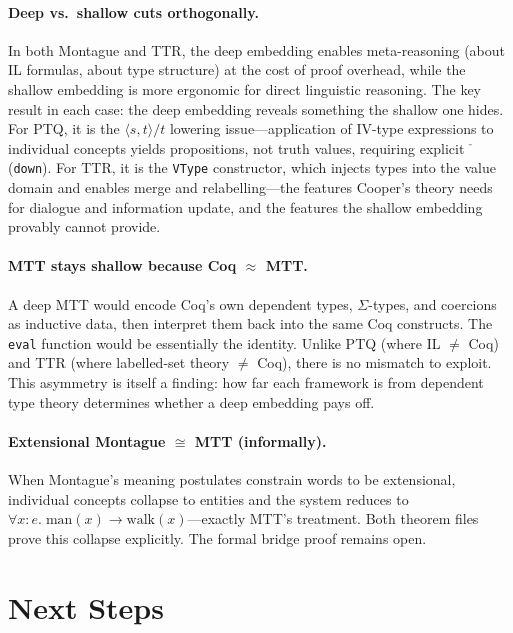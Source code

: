 \documentclass[11pt,a4paper]{article}
\begin{document}
\paragraph{Deep vs.\ shallow cuts orthogonally.} In both Montague and TTR, the deep embedding enables meta-reasoning (about IL formulas, about type structure) at the cost of proof overhead, while the shallow embedding is more ergonomic for direct linguistic reasoning. The key result in each case: the deep embedding reveals something the shallow one hides. For PTQ, it is the $\langle s,t\rangle/t$ lowering issue---application of IV-type expressions to individual concepts yields propositions, not truth values, requiring explicit $\check{\phantom{x}}$ (\texttt{down}). For TTR, it is the \texttt{VType} constructor, which injects types into the value domain and enables merge and relabelling---the features Cooper's theory needs for dialogue and information update, and the features the shallow embedding provably cannot provide.

\paragraph{MTT stays shallow because Coq $\approx$ MTT.} A deep MTT would encode Coq's own dependent types, $\Sigma$-types, and coercions as inductive data, then interpret them back into the same Coq constructs. The \texttt{eval} function would be essentially the identity. Unlike PTQ (where IL $\neq$ Coq) and TTR (where labelled-set theory $\neq$ Coq), there is no mismatch to exploit. This asymmetry is itself a finding: how far each framework is from dependent type theory determines whether a deep embedding pays off.

\paragraph{Extensional Montague $\cong$ MTT (informally).} When Montague's meaning postulates constrain words to be extensional, individual concepts collapse to entities and the system reduces to $\forall x{:}e.\; \text{man}(x) \to \text{walk}(x)$---exactly MTT's treatment. Both theorem files prove this collapse explicitly. The formal bridge proof remains open.

\section{Next Steps}
\end{document}

